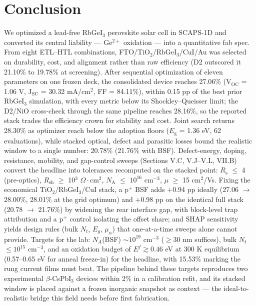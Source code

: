 \documentclass[review]{elsarticle}
\begin{document}
\section{Conclusion}
We optimized a lead-free RbGeI$_{3}$ perovskite solar cell in SCAPS-1D and converted its central liability --- Ge$^{2+}$ oxidation --- into a quantitative fab spec. From eight ETL--HTL combinations, FTO/\allowbreak{}TiO$_{2}$/RbGeI$_{3}$/CuI/\allowbreak{}Au was selected on durability, cost, and alignment rather than raw efficiency (D2 outscored it 21.10\% to 19.78\% at screening).
After sequential optimization of eleven parameters on one frozen deck, the consolidated device reaches 27.06\% (V$_{\mathrm{OC}}$ = 1.06 V, J$_{\mathrm{SC}}$ = 30.32 mA/cm$^{2}$, FF = 84.11\%), within 0.15 pp of the best prior RbGeI$_{3}$ simulation, with every metric below its Shockley--Queisser limit; the D2/NiO cross-check through the same pipeline reaches 28.16\%, so the reported stack trades the efficiency crown for stability and cost. Joint search returns 28.30\% as optimizer reach below the adoption floors ($E_{\mathrm{g}}$ = 1.36 eV, 62 evaluations), while stacked optical, defect and parasitic losses bound the realistic window to a single number: 20.78\% (21.76\% with BSF). Defect-energy, doping, resistance, mobility, and gap-control sweeps (Sections V.C, V.J--V.L, VII.B) convert the headline into tolerances recomputed on the stacked point: $R_{\mathrm{s}}$ $\le$ 4 (pre-optics), $R_{\mathrm{sh}}$ $\ge$ 10$^{3}$ $\Omega\cdot$cm$^{2}$, $N_{\mathrm{A}}$ $\le$ $10^{16}$ cm$^{-3}$, $\mu$ $\ge$ 15 cm$^{2}$/Vs. Fixing the economical TiO$_{2}$/RbGeI$_{3}$/CuI stack, a p$^{+}$ BSF adds +0.94 pp ideally (27.06 $\rightarrow$ 28.00\%, 28.01\% at the grid optimum) and +0.98 pp on the identical full stack (20.78 $\rightarrow$ 21.76\%) by widening the rear interface gap, with block-level trap attribution and a p$^{+}$ control isolating the offset share; and SHAP sensitivity yields design rules (bulk $N_{t}$, $E_{g}$, $\mu_{n}$) that one-at-a-time sweeps alone cannot provide. Targets for the lab: $N_{A}$(BSF) $\sim$$10^{19}$ cm$^{-3}$ ($\ge$30 nm suffices), bulk $N_{t}$ $\le$$10^{15}$ cm$^{-3}$, and an oxidation budget of $E^f\gtrsim0.46$ eV at 300 K equilibrium (0.57--0.65 eV for anneal freeze-in) for the headline, with 15.53\% marking the rung current films must beat. The pipeline behind these targets reproduces two experimental $\beta$-CsPbI$_{3}$ devices within 2\% in a calibration refit, and its stacked window is placed against a frozen inorganic snapshot as context --- the ideal-to-realistic bridge this field needs before first fabrication.
\end{document}
